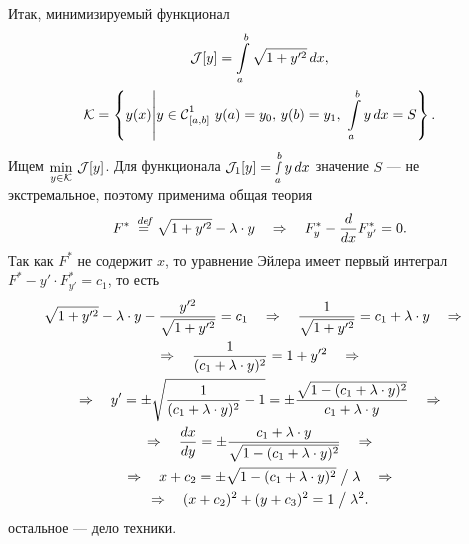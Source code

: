 Итак{\mb,} минимизируемый функционал
\begin{multline*}
	\J[y]=\int\limits_a^b\sqrt{1+y^{\prime2}}\,dx,\\
	\K=\left\{y(x)\middle|y\in\Cfn[{[a,b]}]{1}\ y(a)=y_0,\,y(b)=y_1,\ \int\limits_a^b y\,dx=S\right\}.
\end{multline*}
Ищем $\min\limits_{y\in\mathcal{K}}\,\mathcal{J}[y]$. Для функционала $\mathcal{J}_1[y]=\smallint\limits_a^b y\,dx$ значение $S$ --- не экстремальное, поэтому применима общая теория
\begin{equation*}
	 F^{\ast}\stackrel{\hspace{0.09 cm}de\!f}{=}\sqrt{1+y^{\prime2}}-\lambda\cdot y\quad\Rightarrow\quad F^{\ast}_{y}-\frac{d}{dx}F^{\ast}_{y'}=0.
\end{equation*}
Так как $F^{\ast}$ не содержит $x$, то уравнение Эйлера имеет первый интеграл $F^{\ast}-y'\cdot F^{\ast}_{y'}=c_1$, то есть
\begin{multline*}
	\sqrt{1+y^{\prime2}}-\lambda\cdot y-\frac{y^{\prime2}}{\sqrt{1+y^{\prime2}}}=c_1\quad\Rightarrow\quad
	\frac{1}{\sqrt{1+y^{\prime2}}}=c_1+\lambda\cdot y\quad\Rightarrow\quad\\\Rightarrow\quad\frac{1}{(c_1+\lambda\cdot y)^2}=1+y^{\prime2}\quad\Rightarrow\\\Rightarrow\quad y'=\pm\sqrt{\frac{1}{(c_1+\lambda\cdot y)^2}-1}=\pm\frac{\sqrt{1-(c_1+\lambda\cdot y)^2}}{c_1+\lambda\cdot y}\quad\Rightarrow\\\Rightarrow\quad\frac{dx}{dy}=\pm\frac{c_1+\lambda\cdot y}{\sqrt{1-(c_1+\lambda\cdot y)^2}}\quad\Rightarrow\\\Rightarrow\quad x+c_2=\pm\sqrt{1-(c_1+\lambda\cdot y)^2}\bigm/\lambda\quad\Rightarrow\\\Rightarrow\quad (x+c_2)^2+(y+c_3)^2=1\bigm/\lambda^2.
\end{multline*}
остальное --- дело техники.
